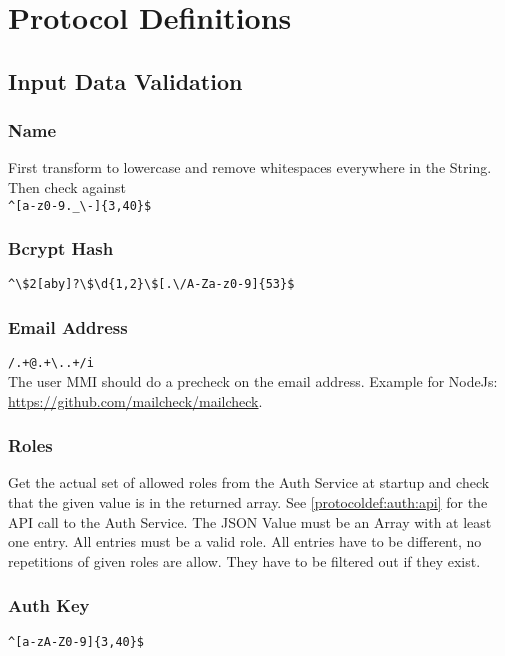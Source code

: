 \chapter{Protocol Definitions}

\section{Input Data Validation}

\subsection{Name}
\label{protocoldef:inputvalidation:name}
First transform to lowercase and remove whitespaces everywhere in the String. Then check against\\
\verb|^[a-z0-9._\-]{3,40}$|

\subsection{Bcrypt Hash}
\label{protocoldef:inputvalidation:bcrypt}
\verb|^\$2[aby]?\$\d{1,2}\$[.\/A-Za-z0-9]{53}$|

\subsection{Email Address}
\label{protocoldef:inputvalidation:email}
\verb|/.+@.+\..+/i|\\
The user MMI should do a precheck on the email address. Example for NodeJs: \url{https://github.com/mailcheck/mailcheck}.

\subsection{Roles}
\label{protocoldef:inputvalidation:roles}
Get the actual set of allowed roles from the Auth Service at startup and check that the given value is in the returned array. See \ref{protocoldef:auth:api} for the API call to the Auth Service.
The JSON Value must be an Array with at least one entry. All entries must be a valid role. All entries have to be different, no repetitions of given roles are allow. They have to be filtered out if they exist.

\subsection{Auth Key}
\label{protocoldef:inputvalidation:authkey}
\verb|^[a-zA-Z0-9]{3,40}$|

